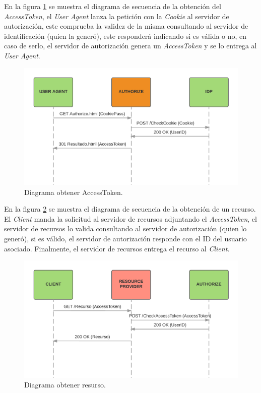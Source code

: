 \documentclass[a4,12pt,onecolum]{article}
\begin{document}
En la figura \ref{fig:oauth3} se muestra el diagrama de secuencia de la obtención del \emph{AccessToken}, el \emph{User Agent} lanza la petición con la \emph{Cookie} al servidor de autorización, este comprueba la validez de la misma consultando al servidor de identificación (quien la generó), este responderá indicando si es válida o no, en caso de serlo, el servidor de autorización genera un \emph{AccessToken} y se lo entrega al \emph{User Agent}. \\

\begin{figure}[htbp]
\centering
\includegraphics[width=1.0\textwidth]{./images/oauth/diagrama_secuencia_getToken.png}
\caption{Diagrama obtener AccessToken.}
\label{fig:oauth3}
\end{figure}


En la figura \ref{fig:oauth4} se muestra el diagrama de secuencia de la obtención de un recurso. El \emph{Client} manda la solicitud al servidor de recursos adjuntando el \emph{AccessToken}, el servidor de recursos lo valida consultando al servidor de autorización (quien lo generó), si es válido, el servidor de autorización responde con el ID del usuario asociado. Finalmente, el servidor de recursos entrega el recurso al \emph{Client}.	\\

\begin{figure}[htbp]
\centering
\includegraphics[width=1.0\textwidth]{./images/oauth/diagrama_obtener_recurso.png}
\caption{Diagrama obtener resurso.}
\label{fig:oauth4}
\end{figure}
\end{document}
